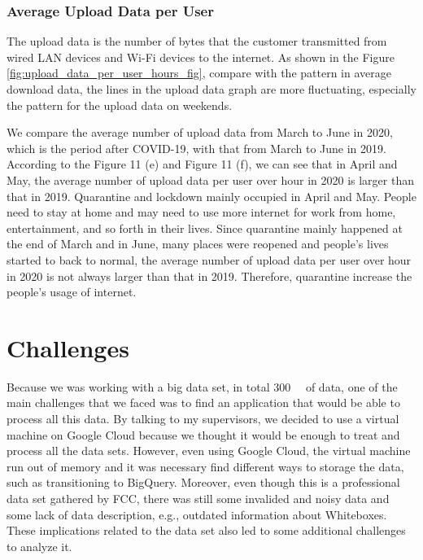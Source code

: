 \documentclass[conference,10pt]{IEEEtran}
\begin{document}
\subsubsection{Average Upload Data per User}
\label{sec:upload-data-per-user-over-hours}

The upload data is the number of bytes that the customer transmitted from wired LAN devices and Wi-Fi devices to the internet. As shown in the Figure \ref{fig:upload_data_per_user_hours_fig}, compare with the pattern in average download data, the lines in the upload data graph are more fluctuating, especially the pattern for the upload data on weekends. 

We compare the average number of upload data from March to June in 2020, which is the period after COVID-19, with that from March to June in 2019. According to the Figure 11 (e) and Figure 11 (f), we can see that in April and May, the average number of upload data per user over hour in 2020 is larger than that in 2019. Quarantine and lockdown mainly occupied in April and May. People need to stay at home and may need to use more internet for work from home, entertainment, and so forth in their lives. Since quarantine mainly happened at the end of March and in June, many places were reopened and people’s lives started to back to normal, the average number of upload data per user over hour in 2020 is not always larger than that in 2019. Therefore, quarantine increase the people’s usage of internet. 

\section{Challenges}
\label{sec:challenges}
Because we was working with a big data set, in total \SI{300}{\giga\byte} of data, one of the main challenges that we faced was to find an application that would be able to process all this data. By talking to my supervisors, we decided to use a virtual machine on Google Cloud because we thought it would be enough to treat and process all the data sets. However, even using Google Cloud, the virtual machine run out of memory and it was necessary find different ways to storage the data, such as transitioning to BigQuery. Moreover, even though this is a professional data set gathered by FCC, there was still some invalided and noisy data and some lack of data description, e.g., outdated information about Whiteboxes. These implications related to the data set also led to some additional challenges to analyze it.
\end{document}
